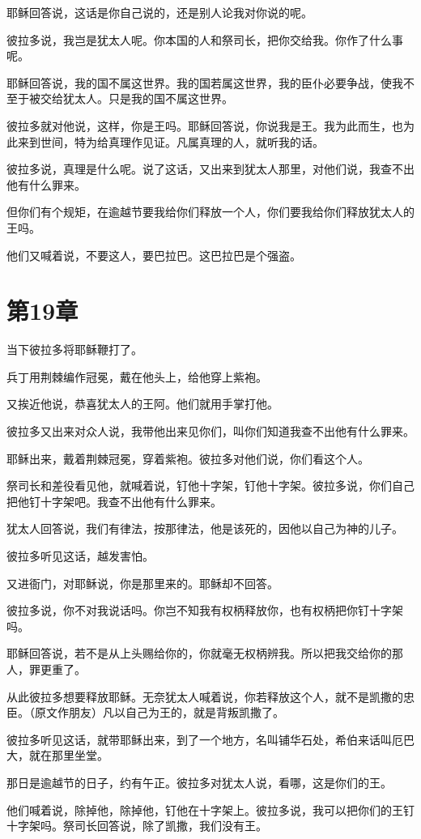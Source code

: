 \documentclass[12pt,oneside]{book}
\begin{document}
耶稣回答说，这话是你自己说的，还是别人论我对你说的呢。

彼拉多说，我岂是犹太人呢。你本国的人和祭司长，把你交给我。你作了什么事呢。

耶稣回答说，我的国不属这世界。我的国若属这世界，我的臣仆必要争战，使我不至于被交给犹太人。只是我的国不属这世界。

彼拉多就对他说，这样，你是王吗。耶稣回答说，你说我是王。我为此而生，也为此来到世间，特为给真理作见证。凡属真理的人，就听我的话。

彼拉多说，真理是什么呢。说了这话，又出来到犹太人那里，对他们说，我查不出他有什么罪来。

但你们有个规矩，在逾越节要我给你们释放一个人，你们要我给你们释放犹太人的王吗。

他们又喊着说，不要这人，要巴拉巴。这巴拉巴是个强盗。

\chapter{第19章}
当下彼拉多将耶稣鞭打了。

兵丁用荆棘编作冠冕，戴在他头上，给他穿上紫袍。

又挨近他说，恭喜犹太人的王阿。他们就用手掌打他。

彼拉多又出来对众人说，我带他出来见你们，叫你们知道我查不出他有什么罪来。

耶稣出来，戴着荆棘冠冕，穿着紫袍。彼拉多对他们说，你们看这个人。

祭司长和差役看见他，就喊着说，钉他十字架，钉他十字架。彼拉多说，你们自己把他钉十字架吧。我查不出他有什么罪来。

犹太人回答说，我们有律法，按那律法，他是该死的，因他以自己为神的儿子。

彼拉多听见这话，越发害怕。

又进衙门，对耶稣说，你是那里来的。耶稣却不回答。

彼拉多说，你不对我说话吗。你岂不知我有权柄释放你，也有权柄把你钉十字架吗。

耶稣回答说，若不是从上头赐给你的，你就毫无权柄辨我。所以把我交给你的那人，罪更重了。

从此彼拉多想要释放耶稣。无奈犹太人喊着说，你若释放这个人，就不是凯撒的忠臣。（原文作朋友）凡以自己为王的，就是背叛凯撒了。

彼拉多听见这话，就带耶稣出来，到了一个地方，名叫铺华石处，希伯来话叫厄巴大，就在那里坐堂。

那日是逾越节的日子，约有午正。彼拉多对犹太人说，看哪，这是你们的王。

他们喊着说，除掉他，除掉他，钉他在十字架上。彼拉多说，我可以把你们的王钉十字架吗。祭司长回答说，除了凯撒，我们没有王。
\end{document}
